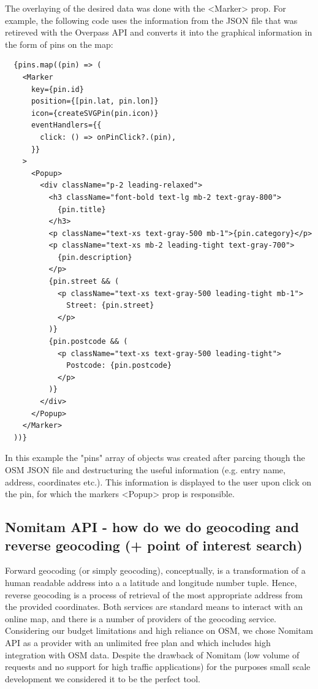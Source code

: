 The overlaying of the desired data was done with the <Marker> prop. For example, the following code uses the information from the JSON file that was retireved with the Overpass API and converts it into the graphical information in the form of pins on the map:
\begin{verbatim}
  {pins.map((pin) => (
    <Marker
      key={pin.id}
      position={[pin.lat, pin.lon]}
      icon={createSVGPin(pin.icon)}
      eventHandlers={{
        click: () => onPinClick?.(pin),
      }}
    >
      <Popup>
        <div className="p-2 leading-relaxed">
          <h3 className="font-bold text-lg mb-2 text-gray-800">
            {pin.title}
          </h3>
          <p className="text-xs text-gray-500 mb-1">{pin.category}</p>
          <p className="text-xs mb-2 leading-tight text-gray-700">
            {pin.description}
          </p>
          {pin.street && (
            <p className="text-xs text-gray-500 leading-tight mb-1">
              Street: {pin.street}
            </p>
          )}
          {pin.postcode && (
            <p className="text-xs text-gray-500 leading-tight">
              Postcode: {pin.postcode}
            </p>
          )}
        </div>
      </Popup>
    </Marker>
  ))}
\end{verbatim}
In this example the "pins" array of objects was created after parcing though the OSM JSON file and destructuring the useful information (e.g. entry name, address, coordinates etc.). This information is displayed to the user upon click on the pin, for which the markers <Popup> prop is responsible. 

\subsection{Nomitam API - how do we do geocoding and reverse geocoding (+ point of interest search)}
Forward geocoding (or simply geocoding), conceptually, is a transformation of a human readable address into a a latitude and longitude number tuple. Hence, reverse geocoding is a process of retrieval of the most appropriate address from the provided coordinates. Both services are standard means to interact with an online map, and there is a number of providers of the geocoding service. Considering our budget limitations and high reliance on OSM, we chose Nomitam API as a provider with an unlimited free plan and which includes high integration with OSM data. Despite the drawback of Nomitam (low volume of requests and no support for high traffic applications) for the purposes small scale development we considered it to be the perfect tool. 

